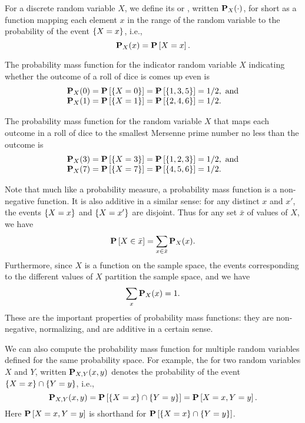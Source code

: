 \begin{flex}
\begin{definition}
For a discrete random variable $X$, we define its  or , written $\mathbf{P}_{X}(\cdot)$, for short as
a function mapping each element $x$ in the range of the random
variable to the probability of the event $\{X =x\}$, i.e.,
\[
\mathbf{P}_{X}(x) = \mathbf{P}\left[{X = x}\right].
\]
\end{definition}

\begin{example}
The probability mass function for the indicator random variable $X$
indicating whether the outcome of a roll of dice is comes up even is 
\[
\begin{array}{lll}
\mathbf{P}_{X}(0) = \mathbf{P}\left[{\{X =0\}}\right] = \mathbf{P}\left[{\{1, 3, 5\}}\right] =
1/2,~\mbox{and}
\\
\mathbf{P}_{X}(1) = \mathbf{P}\left[{\{X =1\}}\right] = \mathbf{P}\left[{\{2, 4, 6\}}\right] =
1/2.
\end{array}
\]

The probability mass function for the random variable $X$
that maps each outcome in a roll of dice to the smallest Mersenne
prime number no less than the outcome is
\[
\begin{array}{lll}
\mathbf{P}_{X}(3) = \mathbf{P}\left[{\{X =3\}}\right] = \mathbf{P}\left[{\{1, 2, 3\}}\right] =
1/2,~\mbox{and}
\\
\mathbf{P}_{X}(7) = \mathbf{P}\left[{\{X =7\}}\right] = \mathbf{P}\left[{\{4, 5, 6\}}\right] =
1/2.
\end{array}
\]
\end{example}
\end{flex}


Note that much like a probability measure, a probability mass function is
a non-negative function.
%
It is also additive in a similar sense: for any distinct $x$ and $x'$, the
events $\{X =x\}$ and $\{X =x'\}$ are disjoint.
%
Thus for any set $\bar{x}$ of values of $X$, we have 
\[
\mathbf{P}\left[{X \in \bar{x}}\right] = \sum_{x \in \bar{x}}{\mathbf{P}_{X}(x)}.
\]
%
Furthermore, since $X$ is a function on the sample space, the events
corresponding to the different values of $X$ partition the sample
space, and we have
\[
\sum_{x}{\mathbf{P}_{X}(x)} = 1.
\]
%
These are the important properties of probability mass functions: they
are non-negative, normalizing, and are additive in a certain sense. 



We can also compute the probability mass function for multiple random
variables defined for the same probability space.
%
For example, the  for two random
variables $X$ and $Y$, written $\mathbf{P}_{X,Y}(x,y)$ denotes the
probability of the event $\{X =x\} \cap \{Y =y\}$, i.e.,
\[
\mathbf{P}_{X,Y}(x,y) = \mathbf{P}\left[{\{X =x\} \cap \{Y =y\}}\right] = \mathbf{P}\left[{X = x, Y = y}\right].
\]
%
Here
 $\mathbf{P}\left[{X = x, Y = y}\right]$ is shorthand for   $\mathbf{P}\left[{\{X =x\} \cap \{Y =y\}}\right]$.


